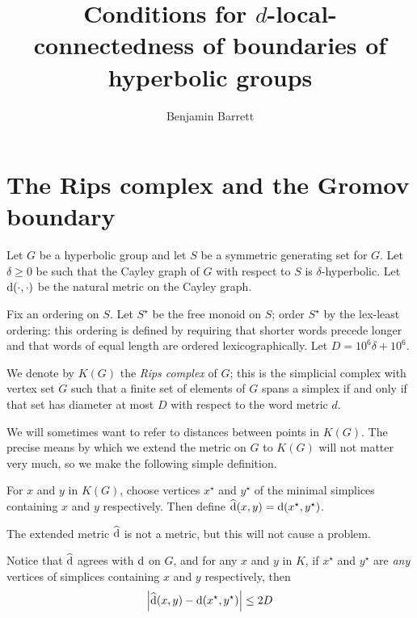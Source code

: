 \documentclass[a4paper]{article}
\title{Conditions for $d$-local-connectedness of boundaries of hyperbolic groups}
\author{Benjamin Barrett}
\begin{document}
\maketitle

\section{The Rips complex and the Gromov boundary}\label{sec:approximating}

Let $G$ be a hyperbolic group and let $S$ be a symmetric generating set for $G$.
Let $\delta \geq 0$ be such that the Cayley graph of $G$ with respect to $S$ is 
$\delta$-hyperbolic. Let $\operatorname{d}(\cdot, \cdot)$ be the natural metric on the
Cayley graph.

Fix an ordering on $S$. Let $S^\star$ be the free monoid on 
$S$; order $S^\star$ by the lex-least ordering: this ordering is defined by 
requiring that shorter words precede longer and that words of equal length are 
ordered lexicographically. Let $D = 10^6\delta + 10^6$.

\begin{definition}
  We denote by $K(G)$ the \emph{Rips complex} of $G$; this is the simplicial
  complex with vertex set $G$ such that a finite set of elements of $G$ spans a
  simplex if and only if that set has diameter at most $D$ with respect to the
  word metric $d$.
\end{definition}

We will sometimes want to refer to distances between points in $K(G)$. The
precise means by which we extend the metric on $G$ to $K(G)$ will not matter
very much, so we make the following simple definition.

\begin{definition}
  For $x$ and $y$ in $K(G)$, choose vertices $x^\star$ and $y^\star$ of the
  minimal simplices containing $x$ and $y$ respectively. Then define
  $\operatorname{\widehat{d}}(x,y) = \operatorname{d}(x^\star, y^\star)$.
\end{definition}

\begin{remark}\label{rem:dist_vs_newdist}
  The extended metric $\operatorname{\widehat{d}}$ is not a metric, but this will not cause a
  problem.

  Notice that $\operatorname{\widehat{d}}$ agrees with $\operatorname{d}$ on $G$, and for any $x$ and $y$ in
  $K$, if $x^\star$ and $y^\star$ are \emph{any} vertices of simplices
  containing $x$ and $y$ respectively, then
  \begin{align*}
    \left|\operatorname{\widehat{d}}(x,y) - \operatorname{d}(x^\star, y^\star)\right| \leq 2D
  \end{align*}
\end{remark}
\end{document}
